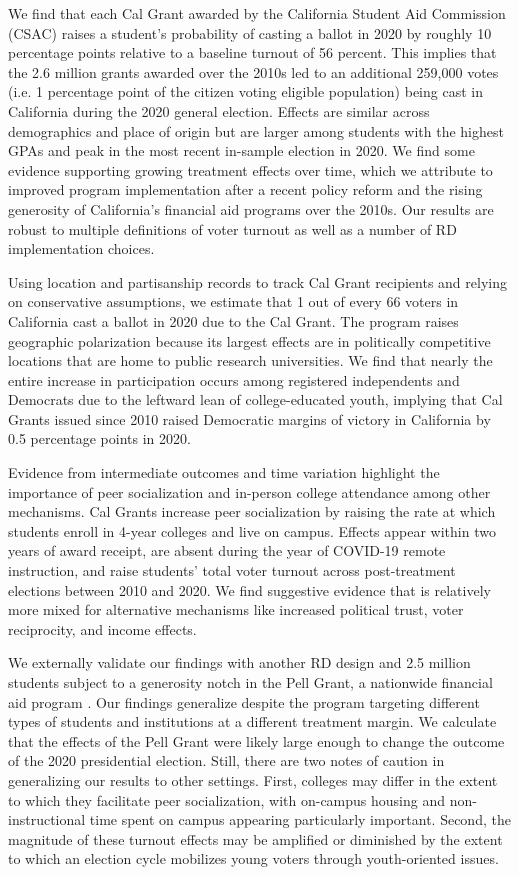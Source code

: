 \documentclass[12pt,letterpaper,oneside]{book}
\begin{document}
We find that each Cal Grant awarded by the California Student Aid Commission (CSAC) raises a student's probability of casting a ballot in 2020 by roughly 10 percentage points relative to a baseline turnout of 56 percent. This implies that the 2.6 million grants awarded over the 2010s led to an additional 259,000 votes (i.e. 1 percentage point of the citizen voting eligible population) being cast in California during the 2020 general election. Effects are similar across demographics and place of origin but are larger among students with the highest GPAs and peak in the most recent in-sample election in 2020. We find some evidence supporting growing treatment effects over time, which we attribute to improved program implementation after a recent policy reform and the rising generosity of California's financial aid programs over the 2010s. Our results are robust to multiple definitions of voter turnout as well as a number of RD implementation choices.

Using location and partisanship records to track Cal Grant recipients and relying on conservative assumptions, we estimate that 1 out of every 66 voters in California cast a ballot in 2020 due to the Cal Grant. The program raises geographic polarization because its largest effects are in politically competitive locations that are home to public research universities. We find that nearly the entire increase in participation occurs among registered independents and Democrats due to the leftward lean of college-educated youth, implying that Cal Grants issued since 2010 raised Democratic margins of victory in California by 0.5 percentage points in 2020.

Evidence from intermediate outcomes and time variation highlight the importance of peer socialization and in-person college attendance among other mechanisms. Cal Grants increase peer socialization by raising the rate at which students enroll in 4-year colleges and live on campus. Effects appear within two years of award receipt, are absent during the year of COVID-19 remote instruction, and raise students' total voter turnout across post-treatment elections between 2010 and 2020. We find suggestive evidence that is relatively more mixed for alternative mechanisms like increased political trust, voter reciprocity, and income effects.

We externally validate our findings with another RD design and 2.5 million students subject to a generosity notch in the Pell Grant, a nationwide financial aid program \citep{denning_propelled:_2019}. Our findings generalize despite the program targeting different types of students and institutions at a different treatment margin. We calculate that the effects of the Pell Grant were likely large enough to change the outcome of the 2020 presidential election. Still, there are two notes of caution in generalizing our results to other settings. First, colleges may differ in the extent to which they facilitate peer socialization, with on-campus housing and non-instructional time spent on campus appearing particularly important. Second, the magnitude of these turnout effects may be amplified or diminished by the extent to which an election cycle mobilizes young voters through youth-oriented issues.
\end{document}
